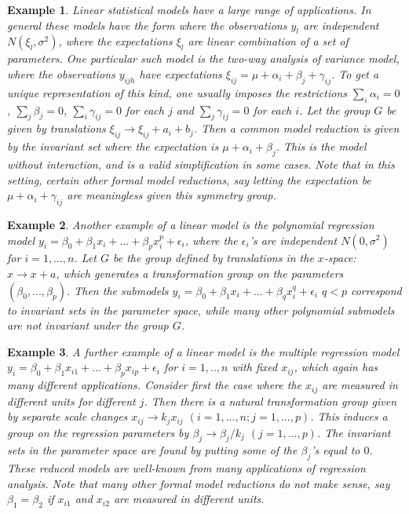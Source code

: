 \documentclass[a4paper, 11pt]{article}
\newtheorem{example}{Example}
\begin{document}
\smallskip

\begin{example}
  Linear statistical models have a large range of applications. In general these models have the form where the observations $y_l$ are independent $N(\xi_l ,\sigma^2 )$, where the expectations $\xi_l$ are linear combination of a set of parameters. One particular such model is the two-way analysis of variance model, where the observations $y_{ijh}$ have expectations $\xi_{ij}=\mu +\alpha_i +\beta_j +\gamma_{ij}$. To get a unique representation of this kind, one usually imposes the restrictions $\sum_i \alpha_i =0$, $\sum_j \beta_j =0$, $\sum_i \gamma_{ij} =0$ for each $j$ and $\sum_j \gamma_{ij} =0$ for each $i$. Let the group $G$ be given by translations $\xi_{ij}\rightarrow\xi_{ij}+a_i+b_j$. Then a common model reduction is given by the invariant set where the expectation is $\mu +\alpha_i +\beta_j $. This is the model without interaction, and is a valid simplification in some cases. Note that in this setting, certain other formal model reductions, say letting the expectation be $\mu+\alpha_i +\gamma_{ij}$ are meaningless given this symmetry group.
\end{example}

\smallskip

\begin{example}
  Another example of a linear model is the polynomial regression model $y_i =\beta_0 + \beta_1 x_i +...+\beta_p x_{i}^p +\epsilon_i$, where the $\epsilon_i$'s are independent $N(0,\sigma ^2)$ for $i=1,...,n$. Let $G$ be the group defined by translations in the $x$-space: $x\rightarrow x+a$, which generates a transformation group on the parameters $(\beta_0 ,...,\beta_p )$. Then the submodels $y_i =\beta_0 + \beta_1 x_i +...+\beta_q x_{i}^q +\epsilon_i$ $q<p$ correspond to invariant sets in the parameter space, while many other polynomial submodels are not invariant under the group $G$. 
\end{example}

\smallskip

\begin{example}
  A further example of a linear model is the multiple regression model $y_i = \beta_0 +\beta_1 x_{i1}+...+\beta_p x_{ip} +\epsilon_i $ for $i=1,..,n$ with fixed $x_{ij}$, which again has many different applications. Consider first the case where the $x_{ij}$ are measured in different units for different $j$. Then there is a natural transformation group given by separate scale changes $x_{ij}\rightarrow k_j x_{ij}$ $(i=1,...,n; j=1,...,p)$. This induces a group on the regression parameters by $\beta_j \rightarrow \beta_j /k_j $ $(j=1,...,p)$. The invariant sets in the parameter space are found by putting some of the $\beta_j$'s equal to $0$. These reduced models are well-known from many applications of regression analysis. Note that many other formal model reductions do not make sense, say $\beta_1=\beta_2$ if $x_{i1}$ and $x_{i2}$ are measured in different units.
\end{example}
\end{document}

